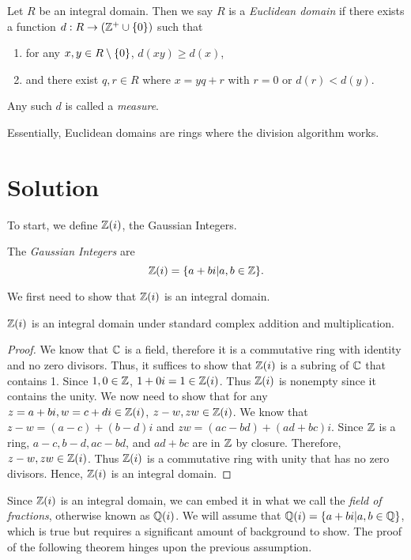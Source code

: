 \documentclass[notitlepage]{simple}
\begin{document}
\begin{definition}
	Let $R$ be an integral domain.
	Then we say $R$ is a \textit{Euclidean domain} if there exists a function $d:R\rightarrow(\mathbb{Z}^+\cup\lbrace 0 \rbrace)$ such that
	\begin{enumerate}
		\item for any $x,y\in R\setminus\lbrace 0 \rbrace$, $d(xy)\geq d(x)$,
		\item and there exist $q,r\in R$ where $x=yq+r$ with $r=0$ or $d(r) < d(y)$.
	\end{enumerate}
	Any such $d$ is called a \textit{measure}.
\end{definition}
Essentially, Euclidean domains are rings where the division algorithm works.

\section{Solution}

To start, we define $\mathbb{Z}(i)$, the Gaussian Integers.

\begin{definition}
	The \textit{Gaussian Integers} are
	\[
		\mathbb{Z}(i)=\lbrace a+bi|a,b\in\mathbb{Z} \rbrace.
	\]
\end{definition}

We first need to show that $\mathbb{Z}(i)$ is an integral domain.

\begin{lemma}
	$\mathbb{Z}(i)$ is an integral domain under standard complex addition and multiplication.
\end{lemma}
\begin{proof}
	We know that $\mathbb{C}$ is a field, therefore it is a commutative ring with identity and no zero divisors.
	Thus, it suffices to show that $\mathbb{Z}(i)$ is a subring of $\mathbb{C}$ that contains 1.
	Since $1,0\in\mathbb{Z}$, $1+0i=1\in\mathbb{Z}(i)$.
	Thus $\mathbb{Z}(i)$ is nonempty since it contains the unity.
	We now need to show that for any $z=a+bi,w=c+di\in\mathbb{Z}(i)$, $z-w,zw\in\mathbb{Z}(i)$.
	We know that $z-w=(a-c)+(b-d)i$ and $zw=(ac-bd)+(ad+bc)i$.
	Since $\mathbb{Z}$ is a ring, $a-c,b-d,ac-bd$, and $ad+bc$ are in $\mathbb{Z}$ by closure.
	Therefore, $z-w,zw\in\mathbb{Z}(i)$.
	Thus $\mathbb{Z}(i)$ is a commutative ring with unity that has no zero divisors.
	Hence, $\mathbb{Z}(i)$ is an integral domain.
\end{proof}

Since $\mathbb{Z}(i)$ is an integral domain, we can embed it in what we call the \textit{field of fractions}, otherwise known as $\mathbb{Q}(i)$.
We will assume that $\mathbb{Q}(i)=\lbrace a+bi|a,b\in\mathbb{Q} \rbrace$, which is true but requires a significant amount of background to show.
The proof of the following theorem hinges upon the previous assumption.
\end{document}
